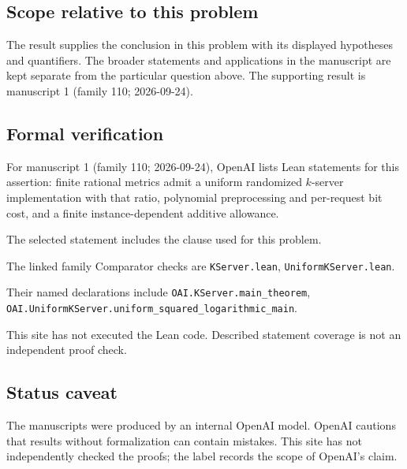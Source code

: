 \documentclass[11pt]{article}
\begin{document}
\subsection{Scope relative to this problem}
The result supplies the conclusion in this problem with its displayed hypotheses and quantifiers. The broader statements and applications in the manuscript are kept separate from the particular question above. The supporting result is manuscript 1 (family 110; 2026-09-24).

\subsection{Formal verification}
For manuscript 1 (family 110; 2026-09-24), OpenAI lists Lean statements for this assertion: finite rational metrics admit a uniform randomized $k$-server implementation with that ratio, polynomial preprocessing and per-request bit cost, and a finite instance-dependent additive allowance.

The selected statement includes the clause used for this problem.

The linked family Comparator checks are \texttt{KServer.lean}, \texttt{UniformKServer.lean}.

Their named declarations include \texttt{OAI.KServer.main\_theorem}, \texttt{OAI.UniformKServer.uniform\_squared\_logarithmic\_main}.

This site has not executed the Lean code. Described statement coverage is not an independent proof check.

\subsection{Status caveat}
The manuscripts were produced by an internal OpenAI model. OpenAI cautions that results without formalization can contain mistakes. This site has not independently checked the proofs; the label records the scope of OpenAI's claim.
\end{document}
